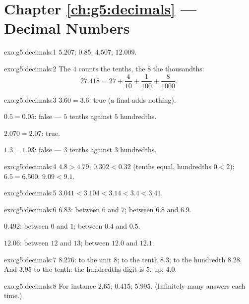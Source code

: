 \section*{Chapter \ref{ch:g5:decimals} --- Decimal Numbers}

\begin{solution}{exo:g5:decimals:1}
$5.207$; \quad $0.85$; \quad $4.507$; \quad $12.009$.
\end{solution}

\begin{solution}{exo:g5:decimals:2}
The $4$ counts the tenths, the $8$ the thousandths:
\[
27.418 = 27 + \frac{4}{10} + \frac{1}{100} + \frac{8}{1000}.
\]
\end{solution}

\begin{solution}{exo:g5:decimals:3}
$3.60 = 3.6$: true (a final  adds nothing).

$0.5 = 0.05$: false --- $5$ tenths against $5$ hundredths.

$2.070 = 2.07$: true.

$1.3 = 1.03$: false --- $3$ tenths against $3$ hundredths.
\end{solution}

\begin{solution}{exo:g5:decimals:4}
$4.8 > 4.79$; \quad $0.302 < 0.32$ (tenths equal, hundredths
$0 < 2$); \quad $6.5 = 6.500$; \quad $9.09 < 9.1$.
\end{solution}

\begin{solution}{exo:g5:decimals:5}
$3.041 < 3.104 < 3.14 < 3.4 < 3.41$.
\end{solution}

\begin{solution}{exo:g5:decimals:6}
$6.83$: between $6$ and $7$; between $6.8$ and $6.9$.

$0.492$: between $0$ and $1$; between $0.4$ and $0.5$.

$12.06$: between $12$ and $13$; between $12.0$ and $12.1$.
\end{solution}

\begin{solution}{exo:g5:decimals:7}
$8.276$: to the unit $8$; to the tenth $8.3$; to the hundredth
$8.28$. And $3.95$ to the tenth: the hundredths digit is $5$, 
up: $4.0$.
\end{solution}

\begin{solution}{exo:g5:decimals:8}
For instance $2.65$; \quad $0.415$; \quad $5.995$. (Infinitely many
answers each time.)
\end{solution}

